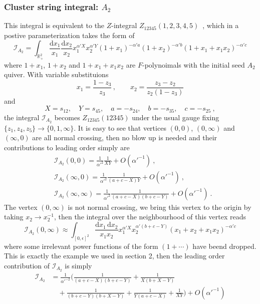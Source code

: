 \documentclass[12pt]{article}
\theoremstyle{definition}
\theoremstyle{plain}
\newcommand{\dif}{\mathrm{d}} %
\begin{document}
\subsubsection*{Cluster string integral: $A_{2}$}
This integral is equivalent to the $Z$-integral $Z_{12345}(1,2,3,4,5)$~\cite{}, which in a postive parameterization takes the form of 
\[
	\mathcal{I}_{A_{2}}=\int_{\mathbb R_+^2} \frac{\dif x_1}{x_1}\frac{\dif x_2}{x_2}x_1^{\alpha' X}x_2^{\alpha' Y}
	(1+x_1)^{-\alpha' a}(1+x_2)^{-\alpha' b}(1+x_1+x_1x_2)^{-\alpha' c}
\] 
where $1+x_{1}$, $1+x_{2}$ and $1+x_{1}+x_{1}x_{2}$ are $F$-polynoimals with the initial seed $A_{2}$ quiver. With variable substituions
\[
	x_{1}=\frac{1-z_{3}}{z_{3}}\,,\qquad x_{2}=\frac{z_{3}-z_{2}}{z_{2}(1-z_{3})}
\]
and 
\[
	X=s_{12},\quad Y=s_{45},\quad a=-s_{24},\quad b=-s_{35},\quad c=-s_{25} \:,
	\] 
the integral $\mathcal{I}_{A_{2}}$ becomes $Z_{12345}(12345)$ under the usual gauge fixing $\{z_{1},z_{4},z_{5}\}\to\{0,1,\infty\}$. It is easy to see that vertices $(0,0)$, $(0,\infty)$ and $(\infty,0)$ are all normal crossing, then no blow up is needed and their contributions to leading order simply are
\begin{align*}
	&\mathcal{I}_{A_{2}}(0,0)=\frac{1}{\alpha'^{2}}\frac{1}{XY}+O(\alpha'^{-1}) \:, \\
	&\mathcal{I}_{A_{2}}(\infty,0)=\frac{1}{\alpha'^{2}}\frac{1}{(a+c-X)Y}+O(\alpha'^{-1}) \:, \\
	&\mathcal{I}_{A_{2}}(\infty,\infty)=\frac{1}{\alpha'^{2}}\frac{1}{(a+c-X)(b+c-Y)}+O(\alpha'^{-1}) \:.
\end{align*}
The vertex $(0,\infty)$ is not normal crossing, we bring this vertex to the origin by taking $x_{2}\to x_{2}^{-1}$, then the integral over the neighbourhood of this vertex reads
\[
    \mathcal{I}_{A_{2}}(0,\infty) \approx \int_{[0,\epsilon]^{2}} \frac{\dif x_{1}\,\dif x_{2}}{x_{1} x_{2}} x_{1}^{\alpha'X}x_{2}^{\alpha'(b+c-Y)}(x_{1}+x_{2}+x_{1}x_{2})^{-\alpha'c}
\]
where some irrelevant power functions of the form $(1+\cdots)$ have beend dropped. This is exactly the example we used in section 2, then the leading order contribution of $\mathcal{I}_{A_{2}}$ is simply
\begin{align*}
   \mathcal{I}_{A_2}&=\frac{1}{\alpha'^{-2}}\biggl(\frac{1}{(a+c-X) (b+c-Y)}+\frac{1}{X (b+X-Y)} \\
   &\quad +\frac{1}{(b+c-Y) (b+X-Y)}+\frac{1}{Y (a+c-X)}+\frac{1}{X Y}\biggr) + O(\alpha'^{-1}) 
\end{align*}
\end{document}
